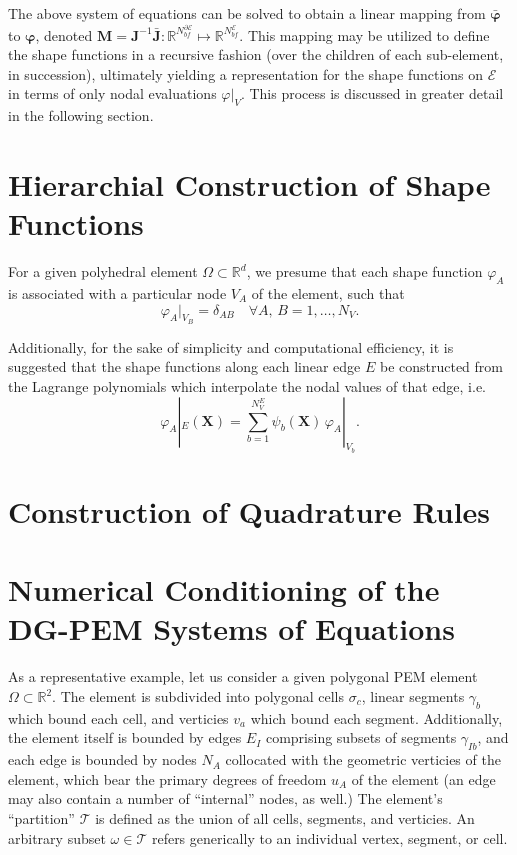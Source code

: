 	The above system of equations can be solved to obtain a linear mapping from $\bar{\boldsymbol{\varphi}}$ to $\boldsymbol{\varphi}$, denoted $\mathbf{M} = \mathbf{J}^{-1} \bar{\mathbf{J}} : \mathbb{R}^{N^{\partial \mathcal{E}}_{bf}} \mapsto \mathbb{R}^{N^{\mathcal{E}}_{bf}}$. This mapping may be utilized to define the shape functions in a recursive fashion (over the children of each sub-element, in succession), ultimately yielding a representation for the shape functions on $\mathcal{E}$ in terms of only nodal evaluations $\varphi|_{V}$. This process is discussed in greater detail in the following section.
	
\section{Hierarchial Construction of Shape Functions}

	For a given polyhedral element $\Omega \subset \mathbb{R}^d$, we presume that each shape function $\varphi_A$ is associated with a particular node $V_A$ of the element, such that
	\begin{equation}
		\varphi_A |_{V_B} = \delta_{AB} \quad \forall A, \, B = 1, \ldots, N_V.
	\end{equation}
	
	Additionally, for the sake of simplicity and computational efficiency, it is suggested that the shape functions along each linear edge $E$ be constructed from the Lagrange polynomials which interpolate the nodal values of that edge, i.e.
	\begin{equation}
		\varphi_A |_{E} (\mathbf{X}) = \sum_{b = 1}^{N^E_V} \psi_b (\mathbf{X}) \, \varphi_A |_{V_b}.
	\end{equation}

\section{Construction of Quadrature Rules}



\section{Numerical Conditioning of the \\ DG-PEM Systems of Equations}

As a representative example, let us consider a given polygonal PEM element $\Omega \subset \mathbb{R}^2$. The element is subdivided into polygonal cells $\sigma_c$, linear segments $\gamma_b$ which bound each cell, and verticies $v_a$ which bound each segment. Additionally, the element itself is bounded by edges $E_I$ comprising subsets of segments $\gamma_{Ib}$, and each edge is bounded by nodes $N_A$ collocated with the geometric verticies of the element, which bear the primary degrees of freedom $u_A$ of the element (an edge may also contain a number of ``internal'' nodes, as well.) The element's ``partition'' $\mathcal{T}$ is defined as the union of all cells, segments, and verticies. An arbitrary subset $\omega \in \mathcal{T}$ refers generically to an individual vertex, segment, or cell.


